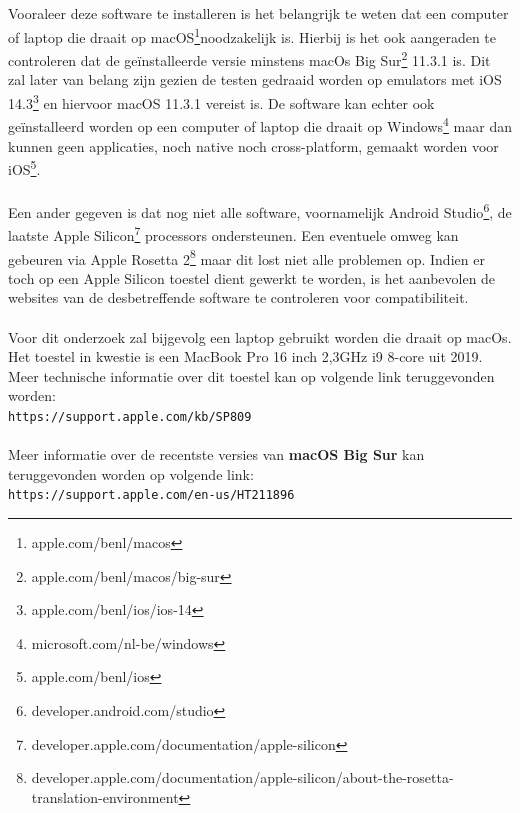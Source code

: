     \subsection{}
    \label{sec:I-hardware}
    Vooraleer deze software te installeren is het belangrijk te weten dat een computer of laptop die draait op macOS\footnote{apple.com/benl/macos}noodzakelijk is. Hierbij is het ook aangeraden te controleren dat de geïnstalleerde versie minstens macOs Big Sur\footnote{apple.com/benl/macos/big-sur} 11.3.1 is. Dit zal later van belang zijn gezien de testen gedraaid worden op emulators met  iOS 14.3\footnote{apple.com/benl/ios/ios-14} en hiervoor macOS 11.3.1 vereist is. De software kan echter ook geïnstalleerd worden op een computer of laptop die draait op Windows\footnote{microsoft.com/nl-be/windows} maar dan kunnen geen applicaties, noch native noch cross-platform, gemaakt worden voor iOS\footnote{apple.com/benl/ios}.
    \\ \\
    Een ander gegeven is dat nog niet alle software, voornamelijk Android Studio\footnote{developer.android.com/studio}, de laatste Apple Silicon\footnote{developer.apple.com/documentation/apple-silicon} processors ondersteunen. Een eventuele omweg kan gebeuren via Apple Rosetta 2\footnote{developer.apple.com/documentation/apple-silicon/about-the-rosetta-translation-environment} maar dit lost niet alle problemen op. Indien er toch op een Apple Silicon toestel dient gewerkt te worden, is het aanbevolen de websites van de desbetreffende software te controleren voor compatibiliteit.  
    \\ \\
    Voor dit onderzoek zal bijgevolg een laptop gebruikt worden die draait op macOs. Het toestel in kwestie is een MacBook Pro 16 inch 2,3GHz i9 8-core uit 2019.
    Meer technische informatie over dit toestel kan op volgende link teruggevonden worden:\\
    \verb*|https://support.apple.com/kb/SP809|
    \\ \\
    Meer informatie over de recentste versies van \textbf{macOS Big Sur} kan teruggevonden worden op volgende link:\\
    \verb*|https://support.apple.com/en-us/HT211896|

